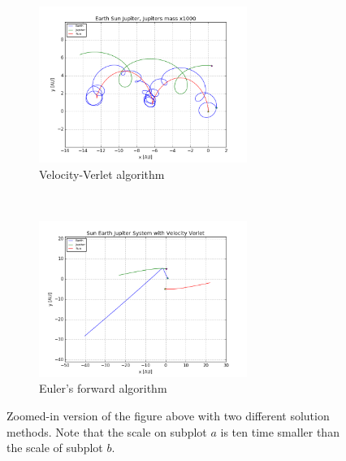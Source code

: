 \documentclass[a4paper, 10pt]{article}
\begin{document}
\begin{figure}[t!]
    \centering
    \begin{subfigure}[t]{0.5\textwidth}
        \centering
        \includegraphics[height=2.0in]{orbitESJ1000.png}
        \caption{Velocity-Verlet algorithm}
    \end{subfigure}%
    ~ 
    \begin{subfigure}[t]{0.5\textwidth}
        \centering
        \includegraphics[height=2.0in]{orbitSEJMCAtOri.png}
        \caption{Euler's forward algorithm}
    \end{subfigure}
    \caption{Zoomed-in version of the figure above with two different solution methods. Note that the scale on subplot $a$ is ten time smaller than the scale of subplot $b$.}
\end{figure}
\end{document}
